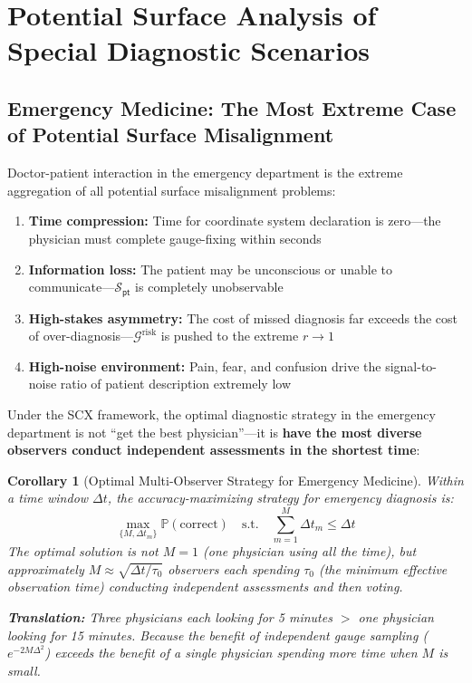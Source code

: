 \documentclass[12pt,a4paper]{article}
\newtheorem{corollary}[theorem]{Corollary}
\theoremstyle{remark}
\newcommand{\Pbb}{\mathbb{P}}
\newcommand{\G}{\mathcal{G}}
\newcommand{\pt}{\textsf{pt}}
\begin{document}
\section{Potential Surface Analysis of Special Diagnostic Scenarios}
\label{sec:special_scenarios}

\subsection{Emergency Medicine: The Most Extreme Case of Potential Surface Misalignment}

Doctor-patient interaction in the emergency department is the extreme aggregation of all potential surface misalignment problems:

\begin{enumerate}[label=(\arabic*),itemsep=2pt]
    \item \textbf{Time compression:} Time for coordinate system declaration is zero---the physician must complete gauge-fixing within seconds
    \item \textbf{Information loss:} The patient may be unconscious or unable to communicate---$\mathcal{S}_{\pt}$ is completely unobservable
    \item \textbf{High-stakes asymmetry:} The cost of missed diagnosis far exceeds the cost of over-diagnosis---$\G^{\text{risk}}$ is pushed to the extreme $r \to 1$
    \item \textbf{High-noise environment:} Pain, fear, and confusion drive the signal-to-noise ratio of patient description extremely low
\end{enumerate}

Under the SCX framework, the optimal diagnostic strategy in the emergency department is not ``get the best physician''---it is \textbf{have the most diverse observers conduct independent assessments in the shortest time}:

\begin{corollary}[Optimal Multi-Observer Strategy for Emergency Medicine]\label{cor:emergency}
Within a time window $\Delta t$, the accuracy-maximizing strategy for emergency diagnosis is:
\begin{equation}
    \max_{\{M, \Delta t_m\}} \Pbb(\text{correct}) \quad \text{s.t.} \quad \sum_{m=1}^{M} \Delta t_m \leq \Delta t
\end{equation}
The optimal solution is not $M=1$ (one physician using all the time), but approximately $M \approx \sqrt{\Delta t / \tau_0}$ observers each spending $\tau_0$ (the minimum effective observation time) conducting independent assessments and then voting.

\textbf{Translation:} Three physicians each looking for 5 minutes $>$ one physician looking for 15 minutes. Because the benefit of independent gauge sampling ($e^{-2M\Delta^2}$) exceeds the benefit of a single physician spending more time when $M$ is small.
\end{corollary}
\end{document}
